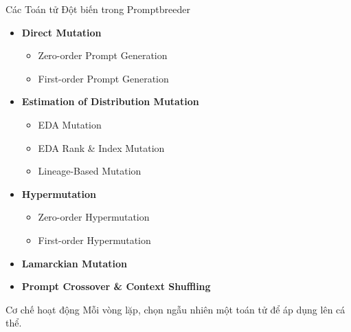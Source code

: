 \documentclass[english,main=vietnamese,xcolor=table]{beamer}
\begin{document}
\begin{frame}{Các Toán tử Đột biến trong Promptbreeder}

\begin{itemize}
    \item \textbf{Direct Mutation} 
    \begin{itemize}
        \item Zero-order Prompt Generation
        \item First-order Prompt Generation
    \end{itemize}

    \item \textbf{Estimation of Distribution Mutation}
    \begin{itemize}
        \item EDA Mutation
        \item EDA Rank \& Index Mutation
        \item Lineage-Based Mutation
    \end{itemize}

    \item \textbf{Hypermutation}
    \begin{itemize}
        \item Zero-order Hypermutation
        \item First-order Hypermutation
    \end{itemize}

    \item \textbf{Lamarckian Mutation}

    \item \textbf{Prompt Crossover \& Context Shuffling}
\end{itemize}


\begin{block}{Cơ chế hoạt động}
Mỗi vòng lặp, chọn ngẫu nhiên một toán tử để áp dụng lên cá thể. 
\end{block}

\end{frame}
\end{document}

